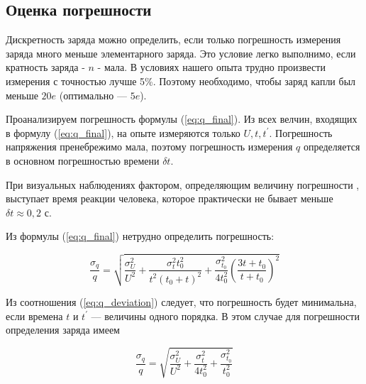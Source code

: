 \documentclass{lab}
\begin{document}
\subsection*{Оценка погрешности}

Дискретность заряда можно определить, если только погрешность измерения заряда много меньше элементарного заряда. Это условие легко выполнимо, если кратность заряда - $n$ - мала. В условиях нашего опыта трудно произвести измерения с точностью лучше 5\%. Поэтому необходимо, чтобы заряд капли был меньше $20e$ (оптимально — $5e$).

Проанализируем погрешность формулы (\eqref{eq:q_final}). Из всех велчин, входящих в формулу (\eqref{eq:q_final}), на опыте измеряются только $U, t, t^{'}$. Погрешность напряжения пренебрежимо мала, поэтому погрешность измерения $q$  определяется в основном погрешностью времени $\delta t$.

При визуальных наблюдениях фактором, определяющим величину погрешности , выступает время реакции человека, которое практически не бывает меньше $\delta t \approx 0,2$ с.

Из формулы (\eqref{eq:q_final}) нетрудно определить погрешность:

\begin{equation}
	\frac{\sigma_q}{q} = \sqrt{{\frac{\sigma^2_{U}}{U^{2}} + \frac{\sigma^2_{t} t_{0}^{2}}{t^{2} (t_{0}+t)^{2}}} + \frac{\sigma^2_{t_0}}{4t_{0}^{2}} \left(\frac{3 t + t_{0}}{t + t_{0}}\right)^{2}}
	\label{eq:q_deviation}
\end{equation}

Из соотношения (\eqref{eq:q_deviation}) следует, что погрешность будет минимальна, если времена $t \text{ и } t^{'}$ — величины одного порядка. В этом случае для погрешности определения заряда имеем

\begin{equation}
	\frac{\sigma_q}{q} = \sqrt{\frac{\sigma^2_{U}}{U^{2}} + \frac{\sigma^2_{t}}{4t_{0}^{2}} + \frac{\sigma^2_{t_0}}{t_{0}^{2}}}
	\label{eq:q_deviation_final}
\end{equation}

\newpage
\end{document}
